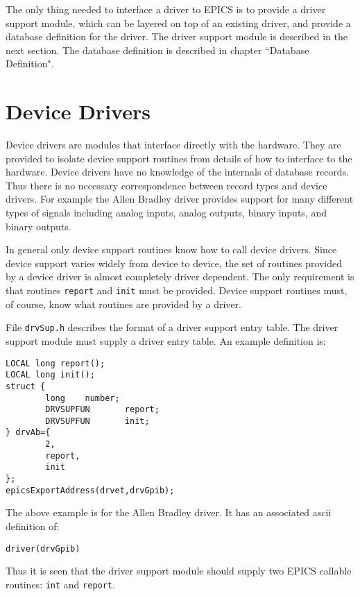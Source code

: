 The only thing needed to interface a driver to EPICS is to provide a driver support module, which can be layered on top of 
an existing driver, and provide a database definition for the driver. The driver support module is described in the next 
section. The database definition is described in chapter ``Database Definition".

\section{Device Drivers}

Device drivers are modules that interface directly with the hardware. They are provided to isolate device support routines 
from details of how to interface to the hardware. Device drivers have no knowledge of the internals of database records. 
Thus there is no necessary correspondence between record types and device drivers. For example the Allen Bradley driver 
provides support for many different types of signals including analog inputs, analog outputs, binary inputs, and binary 
outputs. 

In general only device support routines know how to call device drivers. Since device support varies widely from device 
to device, the set of routines provided by a device driver is almost completely driver dependent. The only requirement is 
that routines \verb|report| and \verb|init| must be provided. Device support routines must, of course, know what routines are 
provided by a driver.

File \verb|drvSup.h| describes the format of a driver support entry table. The driver support module must supply a driver entry 
table. An example definition is:

\begin{verbatim}
LOCAL long report();
LOCAL long init();
struct {
        long    number;
        DRVSUPFUN       report;
        DRVSUPFUN       init;
} drvAb={
        2,
        report,
        init
};
epicsExportAddress(drvet,drvGpib);
\end{verbatim}

The above example is for the Allen Bradley driver. It has an associated ascii definition of:

\begin{verbatim}
driver(drvGpib)
\end{verbatim}

Thus it is seen that the driver support module should supply two EPICS callable routines: \verb|int| and \verb|report|.

